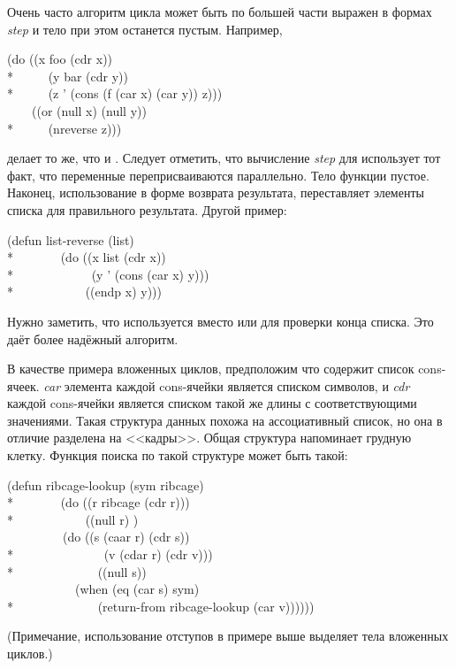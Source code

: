 \begin{defmac}
Очень часто алгоритм цикла может быть по большей части выражен в формах
\emph{step} и тело при этом останется пустым.
Например,
\begin{lisp}
(do ((x foo (cdr x)) \\*
~~~~~(y bar (cdr y)) \\*
~~~~~(z '{\emptylist} (cons (f (car x) (car y)) z))) \\
~~~~((or (null x) (null y)) \\*
~~~~~(nreverse z)))
\end{lisp}
делает то же, что и . Следует отметить, что вычисление
\emph{step} для  использует тот факт, что переменные переприсваиваются
параллельно.
Тело функции пустое. Наконец, использование  в форме возврата
результата, переставляет элементы списка для правильного результата. Другой
пример:
\begin{lisp}
(defun list-reverse (list) \\*
~~~~~~~(do ((x list (cdr x)) \\*
~~~~~~~~~~~~(y '{\emptylist} (cons (car x) y))) \\*
~~~~~~~~~~~((endp x) y)))
\end{lisp}
Нужно заметить, что используется  вместо  или 
для проверки конца списка. Это даёт более надёжный алгоритм.

В качестве примера вложенных циклов, предположим что  содержит список
cons-ячеек.
\emph{car} элемента каждой cons-ячейки является списком символов, и \emph{cdr}
каждой cons-ячейки является списком такой же длины с соответствующими
значениями.
Такая структура данных похожа на ассоциативный список, но она в отличие
разделена на <<кадры>>. Общая структура напоминает грудную клетку.
Функция поиска по такой структуре может быть такой:
\begin{lisp}
(defun ribcage-lookup (sym ribcage) \\*
~~~~~~~(do ((r ribcage (cdr r))) \\*
~~~~~~~~~~~((null r) {\false}) \\
~~~~~~~~~(do ((s (caar r) (cdr s)) \\*
~~~~~~~~~~~~~~(v (cdar r) (cdr v))) \\*
~~~~~~~~~~~~~((null s)) \\
~~~~~~~~~~~(when (eq (car s) sym) \\*
~~~~~~~~~~~~~(return-from ribcage-lookup (car v))))))
\end{lisp}
(Примечание, использование отступов в примере выше выделяет тела вложенных
циклов.) 


\end{defmac}
